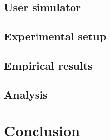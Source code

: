 \subsection{User simulator}

\subsection{Experimental setup}

\subsection{Empirical results}

\subsection{Analysis}

\section{Conclusion}